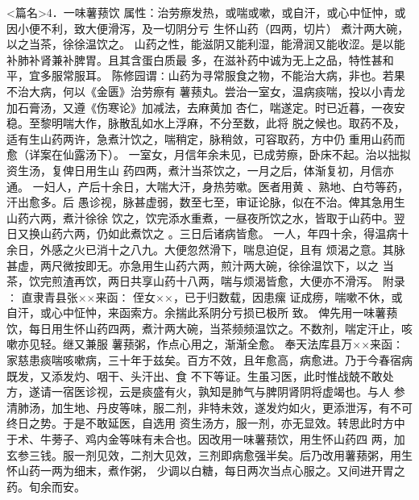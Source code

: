 \documentclass[a4paper,12pt,UTF8,twoside]{ctexbook}
\begin{document}
<篇名>4．一味薯蓣饮
属性：治劳瘵发热，或喘或嗽，或自汗，或心中怔忡，或因小便不利，致大便滑泻，及一切阴分亏 
生怀山药（四两，切片） 煮汁两大碗，以之当茶，徐徐温饮之。 
山药之性，能滋阴又能利湿，能滑润又能收涩。是以能补肺补肾兼补脾胃。且其含蛋白质最 
多，在滋补药中诚为无上之品，特性甚和平，宜多服常服耳。 
陈修园谓∶山药为寻常服食之物，不能治大病，非也。若果不治大病，何以《金匮》治劳瘵有 
薯蓣丸。尝治一室女，温病痰喘，投以小青龙加石膏汤，又遵《伤寒论》加减法，去麻黄加 
杏仁，喘遂定。时已近暮，一夜安稳。至黎明喘大作，脉散乱如水上浮麻，不分至数，此将 
脱之候也。取药不及，适有生山药两许，急煮汁饮之，喘稍定，脉稍敛，可容取药，方中仍 
重用山药而愈（详案在仙露汤下）。 
一室女，月信年余未见，已成劳瘵，卧床不起。治以拙拟资生汤，复俾日用生山 
药四两，煮汁当茶饮之，一月之后，体渐复初，月信亦通。 
一妇人，产后十余日，大喘大汗，身热劳嗽。医者用黄 、熟地、白芍等药，汗出愈多。后 
愚诊视，脉甚虚弱，数至七至，审证论脉，似在不治。俾其急用生山药六两，煮汁徐徐 
饮之，饮完添水重煮，一昼夜所饮之水，皆取于山药中。翌日又换山药六两，仍如此煮饮之 
。三日后诸病皆愈。 
一人，年四十余，得温病十余日，外感之火已消十之八九。大便忽然滑下，喘息迫促，且有 
烦渴之意。其脉甚虚，两尺微按即无。亦急用生山药六两，煎汁两大碗，徐徐温饮下，以之 
当茶，饮完煎渣再饮，两日共享山药十八两，喘与烦渴皆愈，大便亦不滑泻。 
附录∶ 
直隶青县张××来函∶ 
侄女××，已于归数载，因患瘰 证成痨，喘嗽不休，或自汗，或心中怔忡，来函索方。余揣此系阴分亏损已极所 
致。 
俾先用一味薯蓣饮，每日用生怀山药四两，煮汁两大碗，当茶频频温饮之。不数剂，喘定汗止，咳嗽亦见轻。继又兼服 
薯蓣粥，作点心用之，渐渐全愈。 
奉天法库县万××来函∶ 
家慈患痰喘咳嗽病，三十年于兹矣。百方不效，且年愈高，病愈进。乃于今春宿病既发，又添发灼、咽干、头汗出、食 
不下等证。生虽习医，此时惟战兢不敢处方，遂请一宿医诊视，云是痰盛有火，孰知是肺气与脾阴肾阴将虚竭也。与人 
参清肺汤，加生地、丹皮等味，服二剂，非特未效，遂发灼如火，更添泄泻，有不可终日之势。于是不敢延医，自选用 
资生汤方，服一剂，亦无显效。转思此时方中于术、牛蒡子、鸡内金等味有未合也。因改用一味薯蓣饮，用生怀山药四 
两，加玄参三钱。服一剂见效，二剂大见效，三剂即病愈强半矣。后乃改用薯蓣粥，用生怀山药一两为细末，煮作粥， 
少调以白糖，每日两次当点心服之。又间进开胃之药。旬余而安。 
\end{document}
